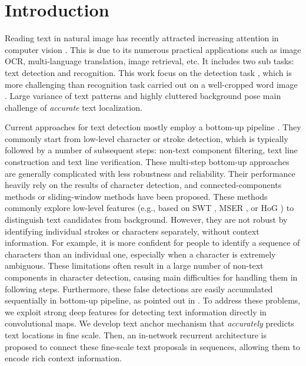 \documentclass[runningheads]{llncs}
\begin{document}
\section{Introduction}


Reading text in natural image has recently attracted increasing attention in computer vision \cite{Gupta2016,Huang2014,Jaderberg2015,He2017,Zhang2016,He2016,He2015,Busta2015,Tian2015,Yin2015}. This is due to its numerous practical applications such as image OCR, multi-language translation,  image retrieval, etc. It includes two sub tasks: text detection and recognition. This work focus on the detection task \cite{Huang2014,Busta2015,Tian2015,Yin2015}, which is more challenging than recognition task carried out on a well-cropped word image \cite{Jaderberg2015,He2015}. Large variance of text patterns and highly cluttered background pose main challenge of \textit{accurate} text localization.

Current approaches for text detection mostly employ a bottom-up pipeline \cite{Tian2015,Busta2015,Huang2014,Yin2015,Yin2014}. They commonly start from  low-level character or stroke detection, which is typically followed by a number of subsequent steps: non-text component filtering, text line construction and text line verification.  These multi-step bottom-up approaches are generally complicated with less  robustness and reliability. Their performance heavily rely on the results of character detection, and connected-components methods or sliding-window methods have been proposed. These methods commonly explore low-level features (e.g., based on SWT \cite{Epshtein2010,Huang2013}, MSER \cite{Huang2014,Yin2014,Neumann2015}, or HoG \cite{Tian2015}) to distinguish text candidates from background. However, they are not robust by identifying individual strokes or characters separately, without context information. For example, it is more confident for people to identify a sequence of characters than an individual one, especially when a character is extremely ambiguous. These limitations often result in a large number of non-text components in character detection, causing  main difficulties for handling them in following steps. Furthermore, these false detections are easily accumulated sequentially in  bottom-up pipeline, as pointed out in \cite{Tian2015}. To address these problems, we exploit strong deep features for detecting text information  directly in  convolutional maps. We develop text anchor mechanism that \textit{accurately} predicts text locations in fine scale. Then, an in-network recurrent architecture is proposed to connect these fine-scale text proposals in sequences, allowing them to encode rich context information.
\end{document}
